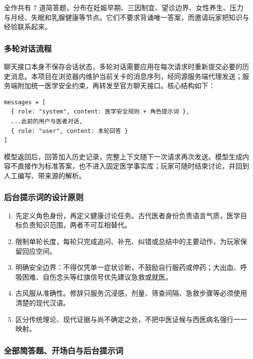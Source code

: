 \documentclass[lang=cn,a4paper,11pt,citestyle=gb7714-2015,bibstyle=gb7714-2015]{elegantpaper}
\begin{document}
全作共有 7 道简答题，分布在妊娠早期、三因制宜、望诊边界、女性养生、压力与月经、失眠和乳腺健康等节点。它们不要求背诵唯一答案，而邀请玩家把知识与经验联系起来。

\subsubsection{多轮对话流程}

聊天接口本身不保存会话状态，多轮对话需要应用在每次请求时重新提交必要的历史消息\cite{deepseekmultiround}。本项目在浏览器内维护当前关卡的消息序列，经同源服务端代理发送；服务端附加统一医学安全约束，再转发至官方聊天接口\cite{deepseekapi}。核心结构如下：

\begin{lstlisting}
messages = [
  { role: "system", content: 医学安全规则 + 角色提示词 },
  ...此前的用户与医者对话,
  { role: "user", content: 本轮回答 }
]
\end{lstlisting}

模型返回后，回答加入历史记录，完整上下文随下一次请求再次发送。模型生成内容不直接作为标准答案，也不进入固定医学事实库；玩家可随时结束讨论，并回到人工编写、带来源的解析。

\subsubsection{后台提示词的设计原则}

\begin{enumerate}[leftmargin=*]
  \item 先定义角色身份，再定义健康讨论任务。古代医者身份负责语言气质，医学目标负责知识范围，两者不可互相替代。
  \item 限制单轮长度，每轮只完成追问、补充、纠错或总结中的主要动作，为玩家保留回应空间。
  \item 明确安全边界：不得仅凭单一症状诊断，不鼓励自行服药或停药；大出血、呼吸困难、自伤念头等红旗信号优先建议急救或就医。
  \item 古风服从准确性。修辞只服务沉浸感，剂量、筛查间隔、急救步骤等必须使用清楚的现代汉语。
  \item 区分传统理论、现代证据与尚不确定之处，不把中医证候与西医病名强行一一映射。
\end{enumerate}

\subsubsection{全部简答题、开场白与后台提示词}


\end{document}
